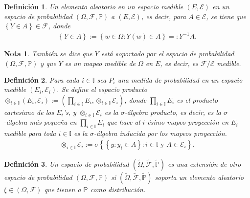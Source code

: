 \documentclass{article}
\newtheorem{Def}{Definición}[section]
\newtheorem{Note}{Nota}[section]
\newcommand{\prob}{\mathbb{P}}
\numberwithin{equation}{section}
\begin{document}
\begin{Def}
Un elemento aleatorio en un espacio medible $\left(E,\mathcal{E}\right)$ en un espacio de probabilidad $\left(\Omega,\mathcal{F},\prob\right)$ a $\left(E,\mathcal{E}\right)$, es decir, para $A\in \mathcal{E}$,  se tiene que $\left\{Y\in A\right\}\in\mathcal{F}$, donde
 \begin{eqnarray}
 \left\{Y\in A\right\}:=\left\{w\in\Omega:Y\left(w\right)\in A\right\}=:Y^{-1}A.
 \end{eqnarray}
\end{Def}

\begin{Note}
Tambi\'en se dice que $Y$ est\'a soportado por el espacio de probabilidad $\left(\Omega,\mathcal{F},\prob\right)$ y que $Y$ es un mapeo medible de $\Omega$ en $E$, es decir, es $\mathcal{F}/\mathcal{E}$ medible.
\end{Note}

\begin{Def}
Para cada $i\in \mathbb{I}$ sea $P_{i}$ una medida de probabilidad en un espacio medible $\left(E_{i},\mathcal{E}_{i}\right)$. Se define el espacio producto $\otimes_{i\in\mathbb{I}}\left(E_{i},\mathcal{E}_{i}\right):=\left(\prod_{i\in\mathbb{I}}E_{i},\otimes_{i\in\mathbb{I}}\mathcal{E}_{i}\right)$, donde $\prod_{i\in\mathbb{I}}E_{i}$ es el producto cartesiano de los $E_{i}$'s, y $\otimes_{i\in\mathbb{I}}\mathcal{E}_{i}$ es la $\sigma$-\'algebra producto, es decir, es la $\sigma$-\'algebra m\'as peque\~na en $\prod_{i\in\mathbb{I}}E_{i}$ que hace al $i$-\'esimo mapeo proyecci\'on en $E_{i}$ medible para toda $i\in\mathbb{I}$ es la $\sigma$-\'algebra inducida por los mapeos proyecci\'on. 
\begin{eqnarray}
\otimes_{i\in\mathbb{I}}\mathcal{E}_{i}:=\sigma\left\{\left\{y:y_{i}\in A\right\}:i\in\mathbb{I}\textrm{ y }A\in\mathcal{E}_{i}\right\}.
\end{eqnarray}
\end{Def}

\begin{Def}
Un espacio de probabilidad $\left(\tilde{\Omega},\tilde{\mathcal{F}},\tilde{\prob}\right)$ es una extensi\'on de otro espacio de probabilidad $\left(\Omega,\mathcal{F},\prob\right)$ si $\left(\tilde{\Omega},\tilde{\mathcal{F}},\tilde{\prob}\right)$ soporta un elemento aleatorio $\xi\in\left(\Omega,\mathcal{F}\right)$ que tienen a $\prob$ como distribuci\'on.
\end{Def}
\end{document}
